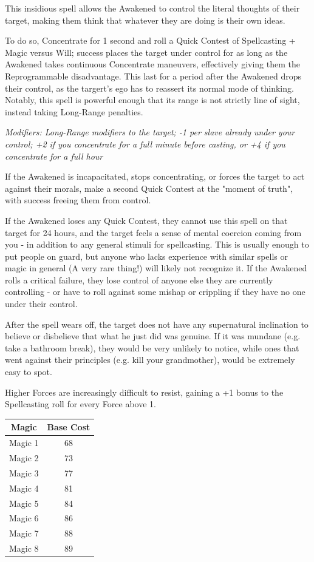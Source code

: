 \begin{multicols}{3}
	This insidious spell allows the Awakened to control the literal thoughts of their target, making them think that whatever they are doing is their own ideas.
	
	To do so, Concentrate for 1 second and roll a Quick Contest of Spellcasting + Magic versus Will; success places the target under control for as long as the Awakened takes continuous Concentrate maneuvers, effectively giving them the Reprogrammable disadvantage. This last for a period after the Awakened drops their control, as the targert's ego has to reassert its normal mode of thinking. Notably, this spell is powerful enough that its range is not strictly line of sight, instead taking Long-Range penalties.
	
	\textcolor{NavyBlue}{\textit{Modifiers: Long-Range modifiers to the target; -1 per slave already under your control; +2 if you concentrate for a full minute before casting, or +4 if you concentrate for a full hour}}
	
	If the Awakened is incapacitated, stops concentrating, or forces the target to act against their morals, make a second Quick Contest at the "moment of truth", with success freeing them from control.
	
	If the Awakened loses any Quick Contest, they cannot use this spell on that target for 24 hours, and the target feels a sense of mental coercion coming from you - in addition to any general stimuli for spellcasting. This is usually enough to put people on guard, but anyone who lacks experience with similar spells or magic in general (A very rare thing!) will likely not recognize it. If the Awakened rolls a critical failure, they lose control of anyone else they are currently controlling - or have to roll against some mishap or crippling if they have no one under their control.
	
	After the spell wears off, the target does not have any supernatural inclination to believe or disbelieve that what he just did was genuine. If it was mundane (e.g. take a bathroom break), they would be very unlikely to notice, while ones that went against their principles (e.g. kill your grandmother), would be extremely easy to spot.
	
	Higher Forces are increasingly difficult to resist, gaining a +1 bonus to the Spellcasting roll for every Force above 1.
	
	\begin{center}
		\begin{tabular}{|c|c|}
			\hline
			Magic & Base Cost \\
			\hline
			\hline
			Magic 1 & 68 \\
			Magic 2 & 73 \\
			Magic 3 & 77 \\
			Magic 4 & 81 \\
			Magic 5 & 84 \\
			Magic 6 & 86 \\
			Magic 7 & 88 \\
			Magic 8 & 89 \\
			\hline
		\end{tabular}
	\end{center}	
	

\end{multicols}
